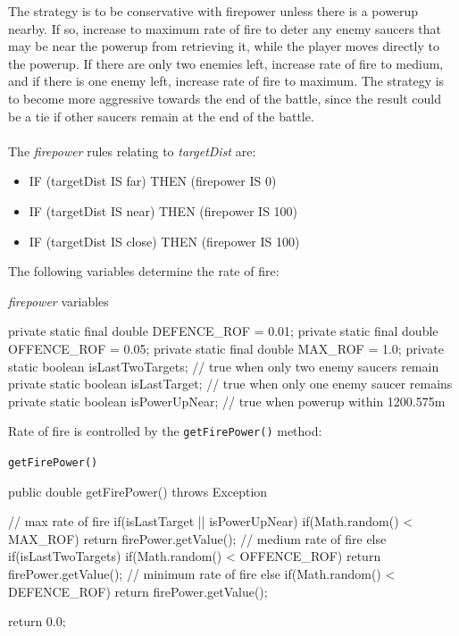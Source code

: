 The strategy is to be conservative with firepower unless there is a powerup nearby. If so, increase to maximum rate of fire to deter any enemy saucers that may be near the powerup from retrieving it, while the player moves directly to the powerup. If there are only two enemies left, increase rate of fire to medium, and if there is one enemy left, increase rate of fire to maximum. The strategy is to become more aggressive towards the end of the battle, since the result could be a tie if other saucers remain at the end of the battle.
\\
\\
The \emph{firepower} rules relating to \emph{targetDist} are:

\begin{itemize}
\item IF (targetDist IS far) THEN (firepower IS 0)
\item IF (targetDist IS near) THEN (firepower IS 100)
\item IF (targetDist IS close) THEN (firepower IS 100)
\end{itemize}

\noindent
The following variables determine the rate of fire:

\begin{listing}[H]
\caption{\emph{firepower} variables}
\begin{javacode}
private static final double DEFENCE_ROF = 0.01;
private static final double OFFENCE_ROF = 0.05;
private static final double MAX_ROF = 1.0;
private static boolean isLastTwoTargets; // true when only two enemy saucers remain
private static boolean isLastTarget; // true when only one enemy saucer remains
private static boolean isPowerUpNear; // true when powerup within 1200.575m
\end{javacode}
\end{listing}

\noindent
Rate of fire is controlled by the \texttt{getFirePower()} method:

\begin{listing}[H]
\caption{\texttt{getFirePower()}}
\begin{javacode}
public double getFirePower() throws Exception {

    // max rate of fire
    if(isLastTarget || isPowerUpNear) {
        if(Math.random() < MAX_ROF) {
            return firePower.getValue();
        }
    // medium rate of fire
    } else if(isLastTwoTargets) {
        if(Math.random() < OFFENCE_ROF) {
            return firePower.getValue();
        }
    // minimum rate of fire
    } else {
        if(Math.random() < DEFENCE_ROF) {
            return firePower.getValue();
        }
    }

    return 0.0;
}
\end{javacode}
\end{listing}

